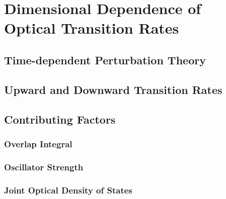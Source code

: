 \chapter{Dimensional Dependence of Optical Transition Rates} \label{RM}
 
\section{Time-dependent Perturbation Theory} \label{dust_seds}

\subsection{} \label{dust_corrections}


\section{Upward and Downward Transition Rates} \label{mbh_seds}

\section{Contributing Factors} \label{BH_conclusions}
\subsection{Overlap Integral}
\subsection{Oscillator Strength}
\subsection{Joint Optical Density of States}

